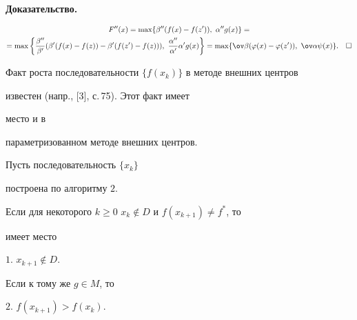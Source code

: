  


{\bf Доказательство.} 


\begin{multline*} 


F''(x)=\max\{\beta''(f(x)-f(z')),\ \alpha''g(x)\}= \\


=\max\bigg\{\frac{\beta''}{\beta'}(\beta'(f(x)-f(z))- 


\beta'(f(z')-f(z))),\ \frac{\alpha''}{\alpha'} 


\alpha'g(x)\bigg\}= 


\max\{\ov\beta(\varphi(x)-\varphi(z')),\ \ov\alpha\psi(x)\}. 


\quad\square 


\end{multline*}  


 


Факт роста последовательности $\{f(x_k)\}$ в методе внешних центров 


известен (напр., [3], с.\,75). Этот факт имеет 


место и в 


параметризованном методе внешних центров. 


 


\begin{lem} Пусть последовательность $\{x_k\}$ 


построена по алгоритму $2$. 


Если для некоторого $k\ge 0$\; $x_k\notin D$ и $f(x_{k+1})\ne f^*$, то 


имеет место 


 


$1.$ $x_{k+1}\notin D$. 


 


\noindent Если к тому же $g\in M$, то 


 


$2.$ $f(x_{k+1})>f(x_k)$. 


\end{lem} 


 


